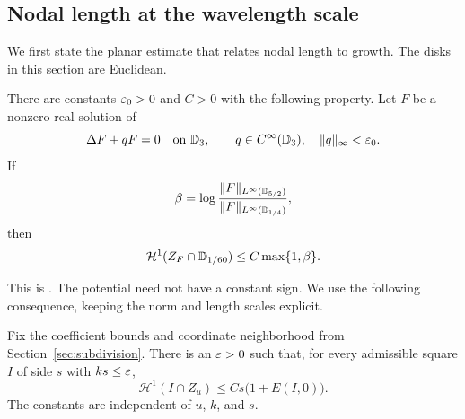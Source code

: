 \begin{samepage}
\section{Nodal length at the wavelength scale}\label{sec:length}

We first state the planar estimate that relates nodal length to
growth. The disks in this section are Euclidean.

\begin{theorem}\label{thm:local-length}
There are constants $\varepsilon_0>0$ and $C>0$ with the following property.
Let $F$ be a nonzero real solution of
\[
 \Delta F+qF=0\quad\text{on }\mathbb D_3,
 \qquad q\in C^\infty(\mathbb D_3),\quad \lVert q\rVert_\infty<\varepsilon_0.
\]
If
\[
 \beta=\log\frac{\lVert F\rVert_{L^\infty(\mathbb D_{5/2})}}
                         {\lVert F\rVert_{L^\infty(\mathbb D_{1/4})}},
\]
then
\[
 \mathcal H^1(Z_F\cap\mathbb D_{1/60})\le C\max\{1,\beta\}.
\]
\end{theorem}
\end{samepage}

This is \cite[Theorem~2.1.1]{RoyFortin2015}. The potential need not
have a constant sign. We use the following consequence, keeping
the norm and length scales explicit.

\begin{lemma}\label{lem:wavelength-length}
Fix the coefficient bounds and coordinate neighborhood from
Section~\ref{sec:subdivision}. There is an $\varepsilon>0$ such that,
for every admissible square $I$ of side $s$ with $ks\le\varepsilon$,
\begin{equation}\label{eq:wavelength-length}
 \mathcal H^1(I\cap Z_u)\le Cs\bigl(1+E(I,0)\bigr).
\end{equation}
The constants are independent of $u$, $k$, and $s$.
\end{lemma}

